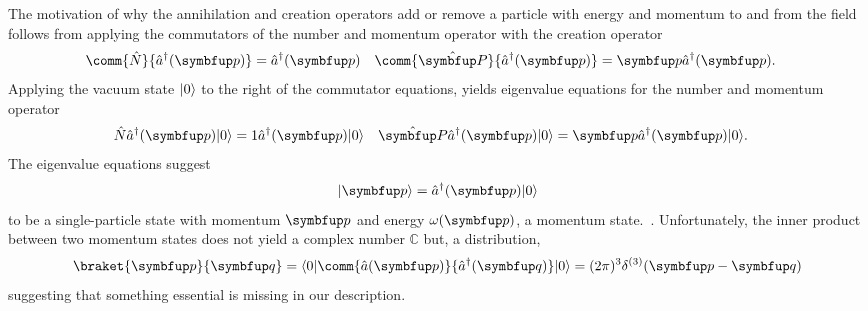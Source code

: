 The motivation of why the annihilation and creation operators add or remove a particle with energy and momentum to and from the field follows from applying the commutators of the number and momentum operator with the creation operator
\begin{align}
	\comm{\hat{N}}{\hat{a}^\dagger(\vb{p})}
	&=
	\hat{a}^\dagger(\vb{p})
	&
	\comm{\vu{P}}{\hat{a}^\dagger(\vb{p})}
	&=
	\vb{p}
	\hat{a}^\dagger(\vb{p})
	.
\end{align}
Applying the vacuum state $\lvert0\rangle$ to the right of the commutator equations, yields eigenvalue equations for the number and momentum operator
\begin{align}
	\hat{N}
	\hat{a}^\dagger(\vb{p})
	\ket{0}
	&=
	1
	\hat{a}^\dagger(\vb{p})
	\ket{0}
	&
	\vu{P}
	\hat{a}^\dagger(\vb{p})
	\ket{0}
	&=
	\vb{p}
	\hat{a}^\dagger(\vb{p})
	\ket{0}
	.
\end{align}
The eigenvalue equations suggest
\begin{equation}
	\ket{\vb{p}}
	=
	\hat{a}^\dagger(\vb{p})
	\ket{0}
	\label{eq:momentum_state}
\end{equation}
to be a single-particle state with momentum $\vb{p}$ and energy $\omega(\vb{p})$, a momentum state.~\cite[p.~23]{Peskin1995}.
Unfortunately, the inner product between two momentum states does not yield a complex number $\mathbb{C}$ but, a distribution,
\begin{equation}
	\braket{\vb{p}}{\vb{q}}
	=
	\bra{0}
	\comm{\hat{a}(\vb{p})}{\hat{a}^\dagger(\vb{q})}
	\ket{0}
	=
	(2\pi)^3
	\delta^{(3)}(\vb{p}-\vb{q})
\end{equation}
suggesting that something essential is missing in our description.

